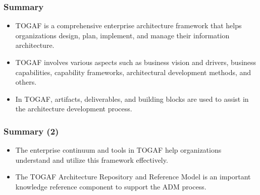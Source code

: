\documentclass[aspectratio=169, table]{beamer}
\begin{document}
    \begin{frame}
        \frametitle{Summary}
        \begin{itemize}
            \item TOGAF is a comprehensive enterprise architecture framework that helps organizations design, plan, implement, and manage their information architecture.
            \item TOGAF involves various aspects such as business vision and drivers, business capabilities, capability frameworks, architectural development methods, and others.
            \item In TOGAF, artifacts, deliverables, and building blocks are used to assist in the architecture development process.
        \end{itemize}
    \end{frame}

    \begin{frame}
        \frametitle{Summary (2)}
        \begin{itemize}
            \item The enterprise continuum and tools in TOGAF help organizations understand and utilize this framework effectively.
            \item The TOGAF Architecture Repository and Reference Model is an important knowledge reference component to support the ADM process.
        \end{itemize}
    \end{frame}
\end{document}
